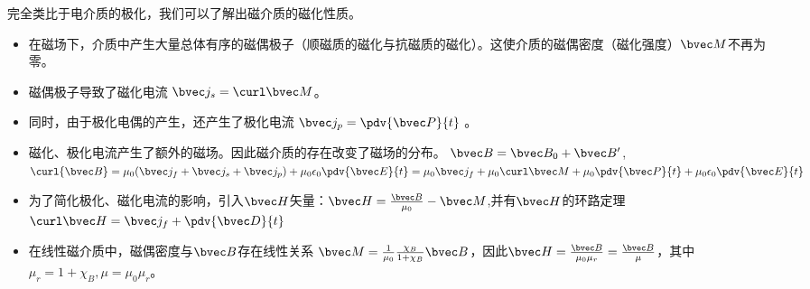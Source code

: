 
完全类比于电介质的极化，我们可以了解出磁介质的磁化性质。

\begin{itemize}
\item 在磁场下，介质中产生大量总体有序的磁偶极子（顺磁质的磁化与抗磁质的磁化）。这使介质的磁偶密度（磁化强度）$\bvec M$不再为零。

\item 磁偶极子导致了磁化电流 $\bvec j_s = \curl \bvec M$。
\item 同时，由于极化电偶的产生，还产生了极化电流 $\bvec j_p = \pdv{\bvec P}{t}$ 。 %

\item 磁化、极化电流产生了额外的磁场。因此磁介质的存在改变了磁场的分布。 $\bvec B = \bvec B_0 + \bvec B'$, $\curl {\bvec B} = \mu_0 (\bvec j_f + \bvec j_s + \bvec j_p) + \mu_0\epsilon_0 \pdv{\bvec E}{t} = \mu_0 \bvec j_f + \mu_0 \curl \bvec M + \mu_0 \pdv{\bvec P}{t} + \mu_0 \epsilon_0 \pdv{\bvec E}{t}$

\item 为了简化极化、磁化电流的影响，引入$\bvec H$矢量：$\bvec H = \frac{\bvec B}{\mu_0} - \bvec M$,并有$\bvec H$的环路定理 $\curl \bvec H = \bvec j_f + \pdv{\bvec D}{t}$

\item 在线性磁介质中，磁偶密度与$\bvec B$存在线性关系  $\bvec M = \frac{1}{\mu_0} \frac{\chi_B}{1+\chi_B}\bvec B$，因此$\bvec H = \frac{\bvec B}{\mu_0\mu_r}= \frac{\bvec B}{\mu}$，其中$\mu_r = 1+\chi_B,  \mu = \mu_0 \mu_r$。
\end{itemize}
